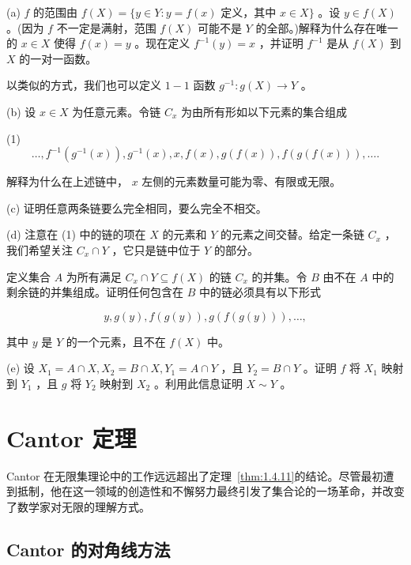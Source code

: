 (a) \(f\) 的范围由 \(f\left( X\right)  = \{ y \in  Y : y = f\left( x\right)\) 定义，其中 \(x \in  X\}\) 。设 \(y \in  f\left( X\right)\) 。(因为 \(f\) 不一定是满射，范围 \(f\left( X\right)\) 可能不是 \(Y\) 的全部。)解释为什么存在唯一的 \(x \in  X\) 使得 \(f\left( x\right)  = y\) 。现在定义 \({f}^{-1}\left( y\right)  = x\) ，并证明 \({f}^{-1}\) 是从 \(f\left( X\right)\) 到 \(X\) 的一对一函数。

以类似的方式，我们也可以定义 \(1 - 1\) 函数 \({g}^{-1} : g\left( X\right)  \rightarrow  Y\) 。

(b) 设 \(x \in  X\) 为任意元素。令链 \({C}_{x}\) 为由所有形如以下元素的集合组成

(1)
\[
\ldots ,{f}^{-1}\left( {{g}^{-1}\left( x\right) }\right) ,{g}^{-1}\left( x\right) ,x,f\left( x\right) ,g\left( {f\left( x\right) }\right) ,f\left( {g\left( {f\left( x\right) }\right) }\right) ,\ldots .
\]

解释为什么在上述链中， \(x\) 左侧的元素数量可能为零、有限或无限。

(c) 证明任意两条链要么完全相同，要么完全不相交。

(d) 注意在 (1) 中的链的项在 \(X\) 的元素和 \(Y\) 的元素之间交替。给定一条链 \({C}_{x}\) ，我们希望关注 \({C}_{x} \cap  Y\) ，它只是链中位于 \(Y\) 的部分。

定义集合 \(A\) 为所有满足 \({C}_{x} \cap  Y \subseteq  f\left( X\right)\) 的链 \({C}_{x}\) 的并集。令 \(B\) 由不在 \(A\) 中的剩余链的并集组成。证明任何包含在 \(B\) 中的链必须具有以下形式

\[
y,g\left( y\right) ,f\left( {g\left( y\right) }\right) ,g\left( {f\left( {g\left( y\right) }\right) }\right) ,\ldots ,
\]

其中 \(y\) 是 \(Y\) 的一个元素，且不在 \(f\left( X\right)\) 中。

(e) 设 \({X}_{1} = A \cap  X,{X}_{2} = B \cap  X,{Y}_{1} = A \cap  Y\) ，且 \({Y}_{2} = B \cap  Y\) 。证明 \(f\) 将 \({X}_{1}\) 映射到 \({Y}_{1}\) ，且 \(g\) 将 \({Y}_{2}\) 映射到 \({X}_{2}\) 。利用此信息证明 \(X \sim  Y\) 。

\section{Cantor 定理}
\label{sec:1.5}
Cantor 在无限集理论中的工作远远超出了定理~\ref{thm:1.4.11}的结论。尽管最初遭到抵制，他在这一领域的创造性和不懈努力最终引发了集合论的一场革命，并改变了数学家对无限的理解方式。

\subsection{Cantor 的对角线方法}

